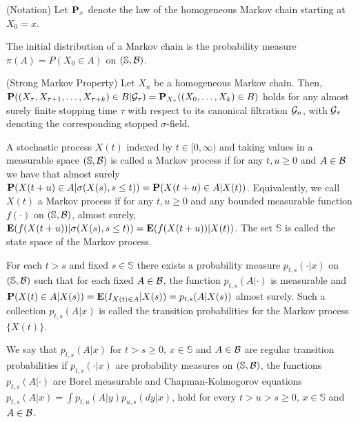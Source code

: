 \begin{remark*} (Notation)
Let $\mathbf{P}_x$ denote the law of the homogeneous Markov chain starting at $X_0 =
x$.
\end{remark*} 

\begin{definition*} 
The initial distribution of a Markov chain is the probability measure $\pi(A) =
P(X_0 \in A)$ on $(\mathbb{S}, \mathcal{B})$.
\end{definition*} 

\begin{proposition*} (Strong Markov Property)
Let $X_n$ be a homogeneous Markov chain. Then,
$\mathbf{P}((X_\tau, X_{\tau + 1}, \dots, X_{\tau + k}) \in B | \mathcal{G}_\tau)
= \mathbf{P}_{X_\tau} ((X_0, \dots, X_k) \in B)$ holds for any almost surely finite
stopping time $\tau$ with respect to its canonical filtration $\mathcal{G}_n$, with
$\mathcal{G}_\tau$ denoting the corresponding stopped $\sigma$-field.
\end{proposition*} 

\begin{definition*} 
A stochastic process $X(t)$ indexed by $t \in [0, \infty)$ and taking values in
a measurable space $(\mathbb{S}, \mathcal{B})$ is called a Markov process if for any $t,
u \ge 0$ and $A \in \mathcal{B}$ we have that almost surely
$\mathbf{P}(X(t + u) \in A | \sigma(X(s), s \le t)) = \mathbf{P}(X(t + u) \in A | X(t))$.
Equivalently, we call $X(t)$ a Markov process if for any $t, u \ge 0$ and any
bounded measurable function $f(\cdot)$ on $(\mathbb{S}, \mathcal{B})$, almost surely,
$\mathbf{E}(f(X(t + u)) | \sigma(X(s), s \le t)) = \mathbf{E}(f(X(t + u)) | X(t))$. The set
$\mathbb{S}$ is called the state space of the Markov process.
\end{definition*} 

\begin{definition*} 
For each $t > s$ and fixed $s \in \mathbb{S}$ there exists a probability measure
$p_{t, s} (\cdot | x)$ on $(\mathbb{S}, \mathcal{B})$ such that for each fixed $A \in
\mathcal{B}$, the function $p_{t, s}(A | \cdot)$ is measurable and
$\mathbf{P}(X(t) \in A | X(s)) = \mathbf{E}(I_{X(t) \in A} | X(s)) = p_{t, s}(A | X(s))$ almost
surely. Such a collection $p_{t, s}(A | x)$ is called the transition
probabilities for the Markov process $\{X(t)\}$.
\end{definition*} 

\begin{definition*} 
We say that $p_{t, s}(A|x)$ for $t > s \ge 0$, $x \in \mathbb{S}$ and $A \in \mathcal{B}$
are regular transition probabilities if $p_{t, s}(\cdot | x)$ are probability
measures on $(\mathbb{S}, \mathcal{B})$, the functions $p_{t, s} (A | \cdot)$ are Borel
measurable and Chapman-Kolmogorov equations $p_{t, s} (A | x) = \int p_{t, u} (A
| y) p_{u, s} (dy | x)$, hold for every $t > u > s \ge 0$, $x \in \mathbb{S}$
and $A \in \mathcal{B}$.
\end{definition*} 

